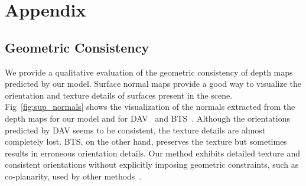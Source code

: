 \documentclass[final]{cvpr}
\begin{document}
\appendix

\section{Appendix}
\subsection{Geometric Consistency}
We provide a qualitative evaluation of the geometric consistency of depth maps predicted by our model. Surface normal maps provide a good way to visualize the orientation and texture details of surfaces present in the scene. Fig~\ref{fig:sup_normals} shows the visualization of the normals extracted from the depth maps for our model and for DAV~\cite{dav_huynh2020guiding} and BTS~\cite{bts_lee2019big}. Although the orientations predicted by DAV seems to be consistent, the texture details are almost completely lost. BTS, on the other hand, preserves the texture but sometimes results in erroneous orientation details. Our method exhibits detailed texture and consistent orientations without explicitly imposing geometric constraints, such as co-planarity, used by other  methods~\cite{dav_huynh2020guiding, bts_lee2019big}.
\end{document}

